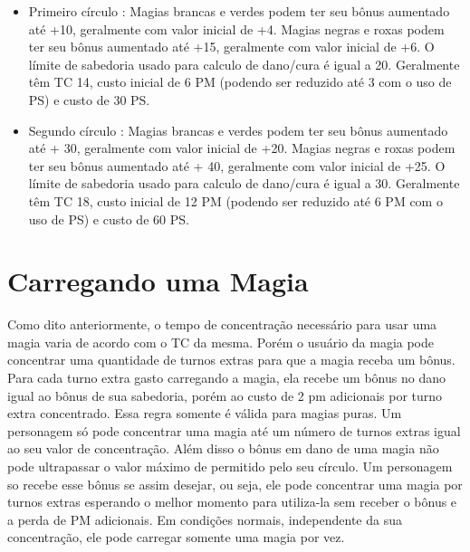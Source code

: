 \begin{itemize}
 
	\item Primeiro círculo : Magias brancas e verdes podem ter seu bônus aumentado até +10, geralmente com valor inicial de +4. Magias negras e roxas podem ter seu bônus aumentado até +15, geralmente com valor inicial de +6. O límite de sabedoria usado para calculo de dano/cura é igual a 20. Geralmente têm TC 14, custo inicial de 6 PM (podendo ser reduzido até 3 com o uso de PS) e custo de 30 PS.

	\item Segundo círculo : Magias brancas e verdes podem ter seu bônus aumentado até + 30, geralmente com valor inicial de +20. Magias negras e roxas podem ter seu bônus aumentado até + 40, geralmente com valor inicial de +25. O límite de sabedoria usado para calculo de dano/cura é igual a 30. Geralmente têm TC 18, custo inicial de 12 PM (podendo ser reduzido até 6 PM com o uso de PS) e custo de 60 PS.



\end{itemize}






\section{Carregando uma Magia}

Como dito anteriormente, o tempo de concentração necessário para usar uma magia varia de acordo com o TC da mesma. Porém o usuário da magia pode concentrar uma quantidade de turnos extras para que a magia receba um bônus. Para cada turno extra gasto carregando a magia, ela recebe um bônus no dano igual ao bônus de sua sabedoria, porém ao custo de 2 pm adicionais por turno extra concentrado. Essa regra somente é válida para magias puras. Um personagem só pode concentrar uma magia até um número de turnos extras igual ao seu valor de concentração. Além disso o bônus em dano de uma magia não pode ultrapassar o valor máximo de permitido pelo seu círculo. Um personagem so recebe esse bônus se assim desejar, ou seja, ele pode concentrar uma magia por turnos extras esperando o melhor momento para utiliza-la sem receber o bônus e a perda de PM adicionais. Em condições normais, independente da sua concentração, ele pode carregar somente uma magia por vez. 



